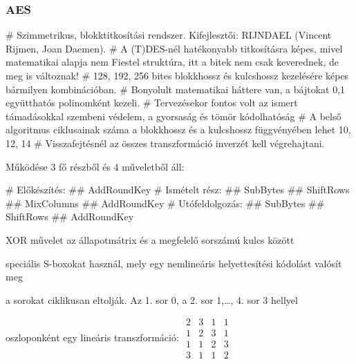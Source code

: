 \subsubsection{AES}
\begin{multicols}{2}
\begin{easylist}[itemize]
# Szimmetrikus, blokktitkosítási rendszer. Kifejlesztői: RIJNDAEL (Vincent Rijmen, Joan Daemen).
# A (T)DES-nél hatékonyabb titkosításra képes, mivel matematikai alapja nem Fiestel struktúra, itt a bitek nem csak keverednek, de meg is változnak!
# 128, 192, 256 bites blokkhossz és kulcshossz kezelésére képes bármilyen kombinációban.
# Bonyolult matematikai háttere van, a bájtokat {0,1} együtthatós polinomként kezeli.
# Tervezésekor fontos volt az ismert támadásokkal szembeni védelem, a gyorsaság és tömör kódolhatóság
# A belső algoritmus ciklusainak száma a blokkhossz és a kulcshossz függvényében lehet 10, 12, 14
# Visszafejtésnél az összes transzformáció inverzét kell végrehajtani.
\end{easylist}
Működése 3 fő részből és 4 műveletből áll:
\begin{easylist}[enumerate]
# Előkészítés:
## AddRoundKey
# Ismételt rész:
## SubBytes
## ShiftRows
## MixColumns
## AddRoundKey
# Utófeldolgozás:
## SubBytes
## ShiftRows
## AddRoundKey
\end{easylist}
\begin{description}[nosep]
	\item[AddRoundKey] XOR művelet az állapotmátrix és a megfelelő sorszámú kulcs között
	\item[SubBytes] speciális S-boxokat használ, mely egy nemlineáris helyettesítési kódolást valósít meg
	\item[ShiftRows] a sorokat ciklikusan eltolják. Az 1. sor 0, a 2. sor 1,\dots, 4. sor 3 hellyel
	\item[MixColumns] oszloponként egy lineáris transzformáció:
	$\begin{matrix}
	2 & 3 & 1 & 1\\
	1 & 2 & 3 & 1\\
	1 & 1 & 2 & 3\\
	3 & 1 & 1 & 2
	\end{matrix}$
\end{description}
\end{multicols}

